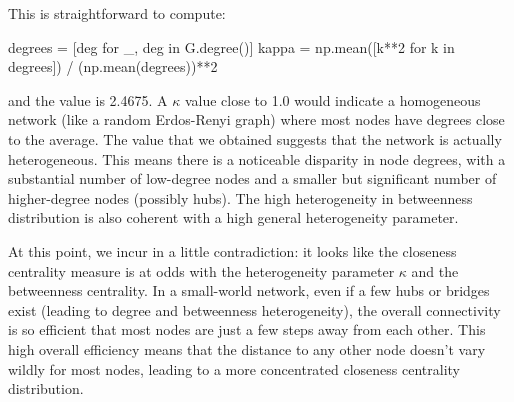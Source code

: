 \documentclass[12pt]{article}
\begin{document}
This is straightforward to compute:
\begin{py}
	degrees = [deg for _, deg in G.degree()]
	kappa = np.mean([k**2 for k in degrees]) / (np.mean(degrees))**2
\end{py}
and the value is 2.4675. A $\kappa$ value close to 1.0 would indicate a homogeneous network (like a random Erdos-Renyi graph) where most nodes have degrees close to the average. The value that we obtained suggests that the network is actually heterogeneous. This means there is a noticeable disparity in node degrees, with a substantial number of low-degree nodes and a smaller but significant number of higher-degree nodes (possibly hubs). The high heterogeneity in betweenness distribution is also coherent with a high general heterogeneity parameter.\par
At this point, we incur in a little contradiction: it looks like the closeness centrality measure is at odds with the heterogeneity parameter $\kappa$ and the betweenness centrality. In a small-world network, even if a few hubs or bridges exist (leading to degree and betweenness heterogeneity), the overall connectivity is so efficient that most nodes are just a few steps away from each other. This high overall efficiency means that the distance to any other node doesn't vary wildly for most nodes, leading to a more concentrated closeness centrality distribution.
\end{document}

